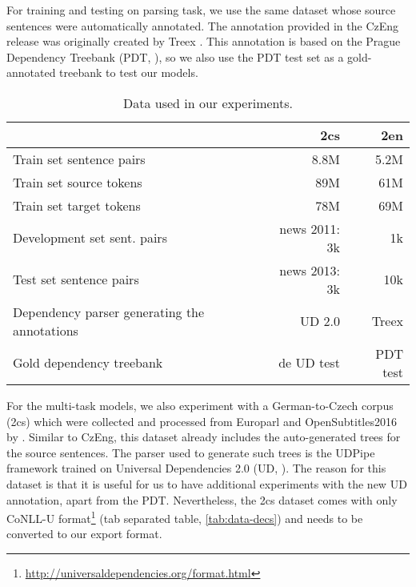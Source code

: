 For training and testing on parsing task, we use the same dataset whose source sentences were automatically annotated.
The annotation provided in the CzEng release was originally created by Treex \citep{tectomt:popel:2010}.
This annotation is based on the Prague Dependency Treebank (PDT, \cite{pdt20:2006}), so we also use the PDT test set as a gold-annotated treebank to test our models.

\begin{table}[t]
\begin{center}
\begin{tabular}{lrr}
	& \textbf{\de2cs} & \textbf{\cs2en} \\
\hline
Train set sentence pairs     		& 8.8M      	& 5.2M \\
Train set source tokens		        & 89M  		    & 61M \\
Train set target tokens		        & 78M  		    & 69M \\
Development set sent. pairs         & news 2011: 3k & 1k \\
Test set sentence pairs          	& news 2013: 3k & 10k \\
Dependency parser generating the annotations				  	& UD 2.0 & Treex \\
Gold dependency treebank     & de UD test & PDT test  \\
\end{tabular}
\end{center}
\caption{Data used in our experiments.}
\label{tab:data}
\end{table}

For the multi-task models, we also experiment with a German-to-Czech corpus (\de2cs) which were collected and processed from Europarl \citep{europarl} and OpenSubtitles2016 \citep{OPUS} by \cite{machacek2018de2cs}.
Similar to CzEng, this dataset already includes the auto-generated trees for the source sentences.
The parser used to generate such trees is the UDPipe framework \citep{udpipe} trained on Universal Dependencies 2.0 (UD, \cite{UD20}).
The reason for this dataset is that it is useful for us to have additional experiments with the new UD annotation, apart from the PDT. Nevertheless, the \de2cs dataset comes with only CoNLL-U format\footnote{\url{http://universaldependencies.org/format.html}} (tab separated table, \cref{tab:data-decs}) and needs to be converted to our export format.

